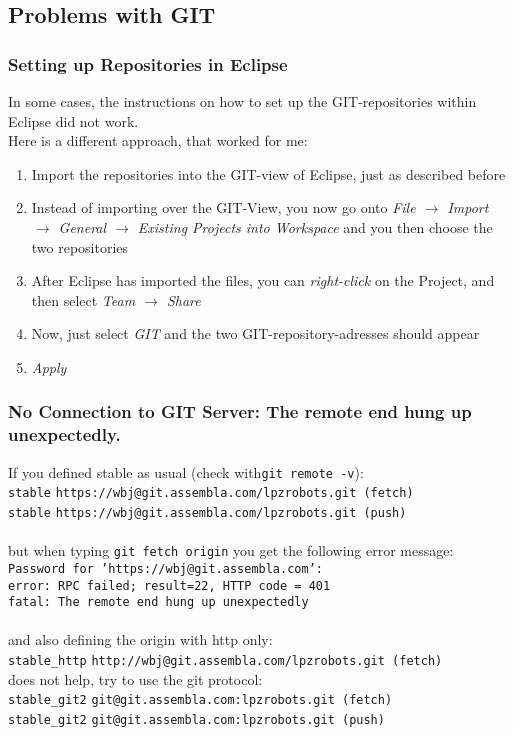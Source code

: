 \subsection{Problems with GIT}

\subsubsection{Setting up Repositories in Eclipse}
\label{EclipseGIT}
In some cases, the instructions on how to set up the GIT-repositories within Eclipse did not work. \\
Here is a different approach, that worked for me: \\
\begin{enumerate}
 \item Import the repositories into the GIT-view of Eclipse, just as described before
 \item Instead of importing over the GIT-View, you now go onto \emph{File $\rightarrow$ Import $\rightarrow$ General $\rightarrow$ Existing Projects into Workspace} and you then choose the two repositories
 \item After Eclipse has imported the files, you can \emph{right-click} on the Project, and then select \emph{Team $\rightarrow$ Share}
 \item Now, just select \emph{GIT} and the two GIT-repository-adresses should appear
 \item \emph{Apply}
\end{enumerate}


\subsubsection{No Connection to GIT Server: The remote end hung up unexpectedly.}

If you defined stable as usual (check with{\tt git remote -v}):\\
 \nolinkurl{stable}    \nolinkurl{https://wbj@git.assembla.com/lpzrobots.git (fetch)}\\
 \nolinkurl{stable}    \nolinkurl{https://wbj@git.assembla.com/lpzrobots.git (push)}\\\\
%
but when typing {\tt git fetch origin} you get the following error message: \\
{\tt Password for 'https://wbj@git.assembla.com':} \\
{\tt error: RPC failed; result=22, HTTP code = 401} \\
{\tt fatal: The remote end hung up unexpectedly} \\\\
%
and also defining the origin with http only:\\
\nolinkurl{stable_http}    \nolinkurl{http://wbj@git.assembla.com/lpzrobots.git (fetch)}\\
does not help, try to use the git protocol:\\
\nolinkurl{stable_git2}    \nolinkurl{git@git.assembla.com:lpzrobots.git (fetch)}\\
\nolinkurl{stable_git2}      \nolinkurl{git@git.assembla.com:lpzrobots.git (push)}

